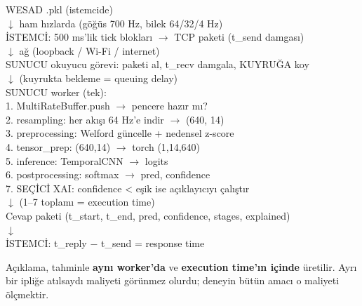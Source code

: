 \documentclass[11pt,a4paper]{report}
\begin{document}
\begin{tcolorbox}[colback=acikGri,colframe=black!30,boxrule=0.6pt]
\ttfamily\footnotesize
WESAD .pkl (istemcide)\\
\hspace*{2em}$\downarrow$ ham hızlarda (göğüs 700 Hz, bilek 64/32/4 Hz)\\
İSTEMCİ: 500 ms'lik tick blokları $\rightarrow$ TCP paketi (t\_send damgası)\\
\hspace*{2em}$\downarrow$ ağ (loopback / Wi-Fi / internet)\\
SUNUCU okuyucu görevi: paketi al, t\_recv damgala, KUYRUĞA koy\\
\hspace*{2em}$\downarrow$ (kuyrukta bekleme = queuing delay)\\
SUNUCU worker (tek): \\
\hspace*{2em}1. MultiRateBuffer.push $\rightarrow$ pencere hazır mı?\\
\hspace*{2em}2. resampling: her akışı 64 Hz'e indir $\rightarrow$ (640, 14)\\
\hspace*{2em}3. preprocessing: Welford güncelle + nedensel z-score\\
\hspace*{2em}4. tensor\_prep: (640,14) $\rightarrow$ torch (1,14,640)\\
\hspace*{2em}5. inference: TemporalCNN $\rightarrow$ logits\\
\hspace*{2em}6. postprocessing: softmax $\rightarrow$ pred, confidence\\
\hspace*{2em}7. SEÇİCİ XAI: confidence < eşik ise açıklayıcıyı çalıştır\\
\hspace*{2em}$\downarrow$ (1--7 toplamı = execution time)\\
Cevap paketi (t\_start, t\_end, pred, confidence, stages, explained)\\
\hspace*{2em}$\downarrow$\\
İSTEMCİ: t\_reply $-$ t\_send = response time
\end{tcolorbox}

\begin{bulgu}
Açıklama, tahminle \textbf{aynı worker'da} ve \textbf{execution time'ın içinde}
üretilir. Ayrı bir ipliğe atılsaydı maliyeti görünmez olurdu; deneyin bütün
amacı o maliyeti ölçmektir.
\end{bulgu}
\end{document}
